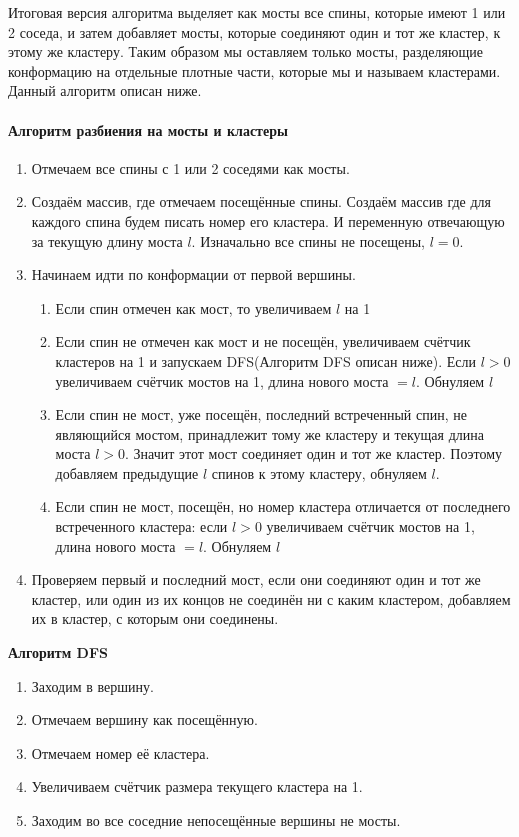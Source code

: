 Итоговая версия алгоритма выделяет как мосты все спины, которые имеют 1 или 2 соседа, и затем добавляет мосты, которые соединяют один и тот же кластер, к этому же кластеру. Таким образом мы оставляем только мосты, разделяющие конформацию на отдельные плотные части, которые мы и называем кластерами. Данный алгоритм описан ниже.

\paragraph{Алгоритм разбиения на мосты и кластеры}
\begin{enumerate}
	\item Отмечаем все спины с 1 или 2 соседями как мосты.
	\item Создаём массив, где отмечаем посещённые спины. Создаём массив где для каждого спина будем писать номер его кластера. И переменную отвечающую за текущую длину моста $l$. Изначально все спины не посещены, $l = 0$.
	\item Начинаем идти по конформации от первой вершины.
	\begin{enumerate}
	
		\item Если спин отмечен как мост, то увеличиваем $l$ на 1
		\item Если спин не отмечен как мост и не посещён, увеличиваем счётчик кластеров на 1 и запускаем DFS(Алгоритм DFS описан ниже). Если $l > 0$ увеличиваем счётчик мостов на 1, длина нового моста $= l$. Обнуляем $l$
		\item Если спин не мост, уже посещён, последний встреченный спин, не являющийся мостом, принадлежит тому же кластеру и текущая длина моста $l > 0$. Значит этот мост соединяет один и тот же кластер. Поэтому добавляем предыдущие $l$ спинов к этому кластеру, обнуляем $l$.
		\item Если спин не мост, посещён, но номер кластера отличается от последнего встреченного кластера: если $l > 0$ увеличиваем счётчик мостов на 1, длина нового моста $= l$. Обнуляем $l$
	\end{enumerate}
	\item Проверяем первый и последний мост, если они соединяют один и тот же кластер, или один из их концов не соединён ни с каким кластером, добавляем их в кластер, с которым они соединены.
\end{enumerate}

\textbf{Алгоритм DFS}
\begin{enumerate}
	\item Заходим в вершину.
	\item Отмечаем вершину как посещённую.
	\item Отмечаем номер её кластера.
	\item Увеличиваем счётчик размера текущего кластера на 1.
	\item Заходим во все соседние непосещённые вершины не мосты.
\end{enumerate}

